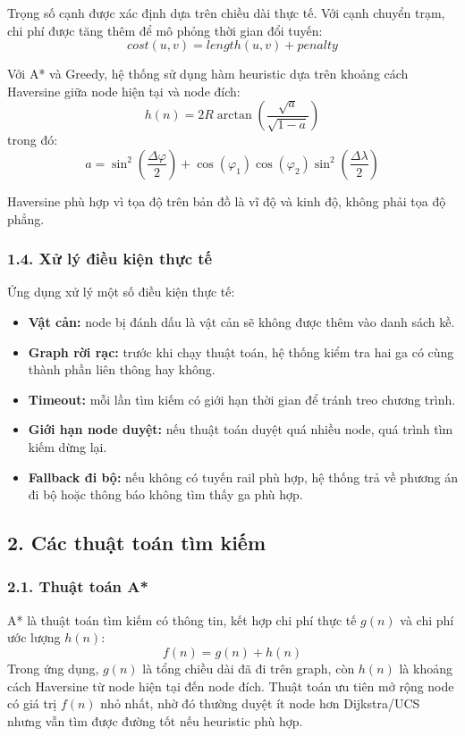 \documentclass[12pt,a4paper]{article}
\begin{document}
Trọng số cạnh được xác định dựa trên chiều dài thực tế. Với cạnh chuyển trạm, chi phí được tăng thêm để mô phỏng thời gian đổi tuyến:
\[
cost(u,v)=length(u,v)+penalty
\]

Với A* và Greedy, hệ thống sử dụng hàm heuristic dựa trên khoảng cách Haversine giữa node hiện tại và node đích:
\[
h(n)=2R\arctan\left(\frac{\sqrt{a}}{\sqrt{1-a}}\right)
\]
trong đó:
\[
a=\sin^2\left(\frac{\Delta \varphi}{2}\right)+
\cos(\varphi_1)\cos(\varphi_2)\sin^2\left(\frac{\Delta \lambda}{2}\right)
\]

Haversine phù hợp vì tọa độ trên bản đồ là vĩ độ và kinh độ, không phải tọa độ phẳng.

\subsubsection*{1.4. Xử lý điều kiện thực tế}

Ứng dụng xử lý một số điều kiện thực tế:
\begin{itemize}
    \item \textbf{Vật cản:} node bị đánh dấu là vật cản sẽ không được thêm vào danh sách kề.
    \item \textbf{Graph rời rạc:} trước khi chạy thuật toán, hệ thống kiểm tra hai ga có cùng thành phần liên thông hay không.
    \item \textbf{Timeout:} mỗi lần tìm kiếm có giới hạn thời gian để tránh treo chương trình.
    \item \textbf{Giới hạn node duyệt:} nếu thuật toán duyệt quá nhiều node, quá trình tìm kiếm dừng lại.
    \item \textbf{Fallback đi bộ:} nếu không có tuyến rail phù hợp, hệ thống trả về phương án đi bộ hoặc thông báo không tìm thấy ga phù hợp.
\end{itemize}

\subsection*{2. Các thuật toán tìm kiếm}

\subsubsection*{2.1. Thuật toán A*}

A* là thuật toán tìm kiếm có thông tin, kết hợp chi phí thực tế $g(n)$ và chi phí ước lượng $h(n)$:
\[
f(n)=g(n)+h(n)
\]
Trong ứng dụng, $g(n)$ là tổng chiều dài đã đi trên graph, còn $h(n)$ là khoảng cách Haversine từ node hiện tại đến node đích. Thuật toán ưu tiên mở rộng node có giá trị $f(n)$ nhỏ nhất, nhờ đó thường duyệt ít node hơn Dijkstra/UCS nhưng vẫn tìm được đường tốt nếu heuristic phù hợp.
\end{document}
